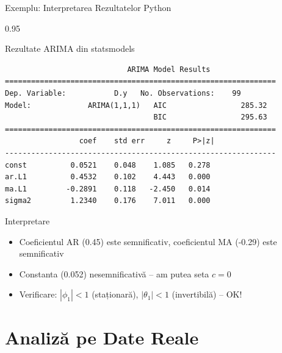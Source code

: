 \documentclass[9pt, aspectratio=169, t]{beamer}
\begin{document}
\begin{frame}[fragile]{Exemplu: Interpretarea Rezultatelor Python}
    \begin{cminipage}{0.95\textwidth}
    \begin{block}{Rezultate ARIMA din statsmodels}
        \scriptsize
        \begin{verbatim}
                            ARIMA Model Results
==============================================================
Dep. Variable:           D.y   No. Observations:    99
Model:             ARIMA(1,1,1)   AIC                 285.32
                                  BIC                 295.63
==============================================================
                 coef    std err     z     P>|z|
--------------------------------------------------------------
const          0.0521    0.048    1.085   0.278
ar.L1          0.4532    0.102    4.443   0.000
ma.L1         -0.2891    0.118   -2.450   0.014
sigma2         1.2340    0.176    7.011   0.000
        \end{verbatim}
    \end{block}
    \vspace{-2mm}
    \begin{exampleblock}{Interpretare}
        \begin{itemize}\setlength{\itemsep}{0pt}
            \item Coeficientul AR (0.45) este semnificativ, coeficientul MA (-0.29) este semnificativ
            \item Constanta (0.052) nesemnificativă -- am putea seta $c=0$
            \item Verificare: $|\phi_1| < 1$ (staționară), $|\theta_1| < 1$ (invertibilă) -- OK!
        \end{itemize}
    \end{exampleblock}
    \end{cminipage}
\end{frame}

\section{Analiză pe Date Reale}
\end{document}
